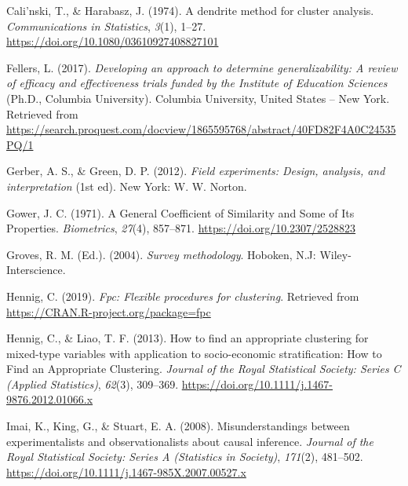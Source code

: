 \documentclass[
  english,
  man,floatsintext]{apa6}
\newlength{\cslhangindent}
\newlength{\cslentryspacingunit} %
\newenvironment{CSLReferences}[2] %
 {%
  \setlength{\parindent}{0pt}
  \ifodd #1
  \let\oldpar\par
  \def\par{\hangindent=\cslhangindent\oldpar}
  \fi
  \setlength{\parskip}{#2\cslentryspacingunit}
 }%
 {}
\begin{document}
\begingroup
\setlength{\parindent}{-0.5in}
\setlength{\leftskip}{0.5in}

\hypertarget{refs}{}
\begin{CSLReferences}{1}{0}
\leavevmode{}%
Cali'nski, T., \& Harabasz, J. (1974). A dendrite method for cluster analysis. \emph{Communications in Statistics}, \emph{3}(1), 1--27. \url{https://doi.org/10.1080/03610927408827101}

\leavevmode{}%
Fellers, L. (2017). \emph{Developing an approach to determine generalizability: {A} review of efficacy and effectiveness trials funded by the {Institute} of {Education Sciences}} (Ph.D., {Columbia University}). {Columbia University}, {United States -- New York}. Retrieved from \url{https://search.proquest.com/docview/1865595768/abstract/40FD82F4A0C24535PQ/1}

\leavevmode{}%
Gerber, A. S., \& Green, D. P. (2012). \emph{Field experiments: Design, analysis, and interpretation} (1st ed). New York: {W. W. Norton}.

\leavevmode{}%
Gower, J. C. (1971). A {General Coefficient} of {Similarity} and {Some} of {Its Properties}. \emph{Biometrics}, \emph{27}(4), 857--871. \url{https://doi.org/10.2307/2528823}

\leavevmode{}%
Groves, R. M. (Ed.). (2004). \emph{Survey methodology}. Hoboken, N.J: {Wiley-Interscience}.

\leavevmode{}%
Hennig, C. (2019). \emph{Fpc: Flexible procedures for clustering}. Retrieved from \url{https://CRAN.R-project.org/package=fpc}

\leavevmode{}%
Hennig, C., \& Liao, T. F. (2013). How to find an appropriate clustering for mixed-type variables with application to socio-economic stratification: {How} to {Find} an {Appropriate Clustering}. \emph{Journal of the Royal Statistical Society: Series C (Applied Statistics)}, \emph{62}(3), 309--369. \url{https://doi.org/10.1111/j.1467-9876.2012.01066.x}

\leavevmode{}%
Imai, K., King, G., \& Stuart, E. A. (2008). Misunderstandings between experimentalists and observationalists about causal inference. \emph{Journal of the Royal Statistical Society: Series A (Statistics in Society)}, \emph{171}(2), 481--502. \url{https://doi.org/10.1111/j.1467-985X.2007.00527.x}


\end{CSLReferences}
\end{document}
